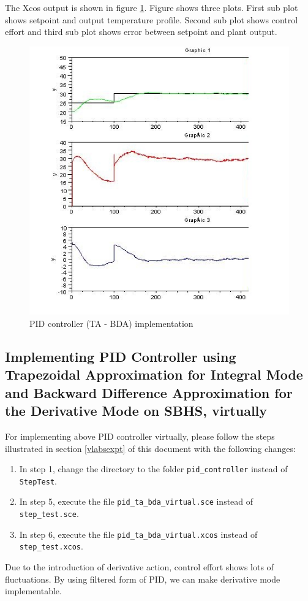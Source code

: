 The Xcos output is shown in figure \ref{pid_ta_bda}.
Figure shows three plots. First sub plot shows setpoint and output temperature profile. Second sub plot shows control 
effort and third sub plot shows error between setpoint and plant output.

\begin{figure}
\centering
\includegraphics[width=0.6\linewidth]{pid_manual/pid_ta_bda_graph.jpg}
\caption{PID controller (TA - BDA) implementation}
\label{pid_ta_bda}
\end{figure}
 

\subsection{Implementing PID Controller using Trapezoidal Approximation for Integral Mode and Backward Difference 
Approximation for the Derivative Mode on SBHS, virtually}
For implementing above PID controller virtually, please follow the steps illustrated in section \ref{vlabsexpt} of this 
document with the following changes:
\begin{enumerate}

\item In step 1, change the directory to the folder {\tt pid\_controller} instead of {\tt StepTest}.
\item In step 5, execute the file {\tt pid\_ta\_bda\_virtual.sce} instead of {\tt step\_test.sce}.
\item In step 6, execute the file {\tt pid\_ta\_bda\_virtual.xcos} instead of {\tt step\_test.xcos}.

\end{enumerate}
Due to the introduction of derivative action, control effort shows lots of fluctuations. By using filtered form of 
PID, we can make derivative mode implementable.


